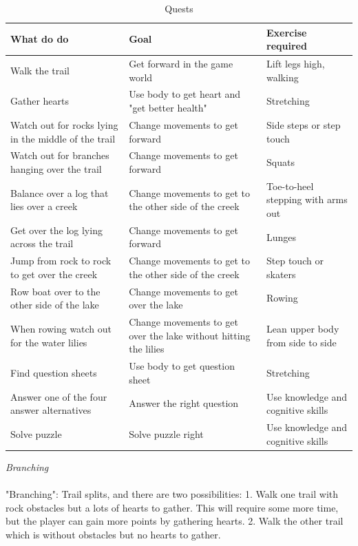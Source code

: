 \begin{table}
     \begin{tabular}{|>{\raggedright}p{}|>{\raggedright}p{4cm}|p{}|}
       \hline
        \textbf{What do do} & \textbf{Goal} & \textbf{Exercise required}  \\ \hline
       Walk the trail & Get forward in the game world & Lift legs high, walking  \\ \hline
       Gather hearts & Use body to get heart and "get better health" &  Stretching \\ \hline
	   Watch out for rocks lying in the middle of the trail & Change movements to get forward & Side steps or step touch  \\ \hline
	     Watch out for branches hanging over the trail & Change movements to get forward & Squats
	      \\ \hline
	       Balance over a log that lies over a creek & Change movements to get to the other side of the creek & Toe-to-heel stepping with arms out \\ \hline
	       Get over the log lying across the trail & Change movements to get forward & Lunges \\ \hline
	       Jump from rock to rock to get over the creek & Change movements to get to the other side of the creek & Step touch or skaters \\ \hline
	       Row boat over to the other side of the lake & Change movements to get over the lake  & Rowing \\ \hline
	       When rowing watch out for the water lilies & Change movements to get over the lake without hitting the lilies  & Lean upper body from side to side \\ \hline
	       Find question sheets & Use body to get question sheet  & Stretching \\ \hline
	       Answer one of the four answer alternatives & Answer the right question  & Use knowledge and cognitive skills \\ \hline
	       Solve puzzle & Solve puzzle right  & Use knowledge and cognitive skills \\ \hline
      \end{tabular}
      \caption[Quests in the "Nature trail" game]{Quests}
    \label{tab:quests1}
 \end{table}
 
\emph{Branching} \\ \\ 
"Branching": Trail splits, and there are two possibilities: 1. Walk one trail with rock obstacles but a lots of hearts to gather. This will require some more time, but the player can gain more points by gathering hearts. 2. Walk the other trail which is without obstacles but no hearts to gather. 

